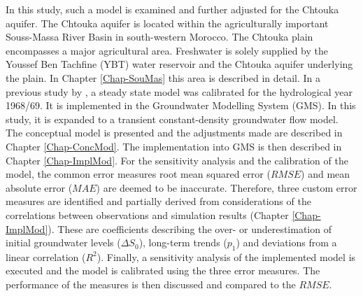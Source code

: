 In this study, such a model is examined and further adjusted for the Chtouka aquifer. 
The Chtouka aquifer is located within the agriculturally important Souss-Massa River Basin in south-western Morocco. 
The Chtouka plain encompasses a major agricultural area. Freshwater is solely supplied by the Youssef Ben Tachfine (YBT) water reservoir and the Chtouka aquifer underlying the plain. 
In Chapter \ref{Chap-SouMas} this area is described in detail. 
In a previous study by \textcite{Horn.2021}, a steady state model was calibrated for the hydrological year 1968/69. 
It is implemented in the Groundwater Modelling System (GMS). 
In this study, it is expanded to a transient constant-density groundwater flow model. 
The conceptual model is presented and the adjustments made are described in Chapter \ref{Chap-ConcMod}. 
The implementation into GMS is then described in Chapter \ref{Chap-ImplMod}. 
For the sensitivity analysis and the calibration of the model, the common error measures root mean squared error ($RMSE$) and mean absolute error ($MAE$) are deemed to be inaccurate. 
Therefore, three custom error measures are identified and partially derived from considerations of the correlations between observations and simulation results (Chapter \ref{Chap-ImplMod}). 
These are coefficients describing the over- or underestimation of initial groundwater levels ($\Delta S_0$), long-term trends ($p_1$) and deviations from a linear correlation ($R^2$). 
Finally, a sensitivity analysis of the implemented model is executed and the model is calibrated using the three error measures. 
The performance of the measures is then discussed and compared to the $RMSE$.
